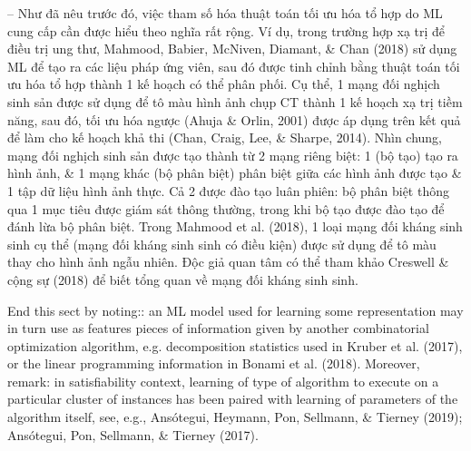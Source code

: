 \documentclass{article}
\begin{document}
\begin{itemize}
\begin{itemize}
\begin{itemize}
            -- Như đã nêu trước đó, việc tham số hóa thuật toán tối ưu hóa tổ hợp do ML cung cấp cần được hiểu theo nghĩa rất rộng. Ví dụ, trong trường hợp xạ trị để điều trị ung thư, Mahmood, Babier, McNiven, Diamant, \& Chan (2018) sử dụng ML để tạo ra các liệu pháp ứng viên, sau đó được tinh chỉnh bằng thuật toán tối ưu hóa tổ hợp thành 1 kế hoạch có thể phân phối. Cụ thể, 1 mạng đối nghịch sinh sản được sử dụng để tô màu hình ảnh chụp CT thành 1 kế hoạch xạ trị tiềm năng, sau đó, tối ưu hóa ngược (Ahuja \& Orlin, 2001) được áp dụng trên kết quả để làm cho kế hoạch khả thi (Chan, Craig, Lee, \& Sharpe, 2014). Nhìn chung, mạng đối nghịch sinh sản được tạo thành từ 2 mạng riêng biệt: 1 (bộ tạo) tạo ra hình ảnh, \& 1 mạng khác (bộ phân biệt) phân biệt giữa các hình ảnh được tạo \& 1 tập dữ liệu hình ảnh thực. Cả 2 được đào tạo luân phiên: bộ phân biệt thông qua 1 mục tiêu được giám sát thông thường, trong khi bộ tạo được đào tạo để đánh lừa bộ phân biệt. Trong Mahmood et al. (2018), 1 loại mạng đối kháng sinh sinh cụ thể (mạng đối kháng sinh sinh có điều kiện) được sử dụng để tô màu thay cho hình ảnh ngẫu nhiên. Độc giả quan tâm có thể tham khảo Creswell \& cộng sự (2018) để biết tổng quan về mạng đối kháng sinh sinh.

            End this sect by noting:: an ML model used for learning some representation may in turn use as features pieces of information given by another combinatorial optimization algorithm, e.g. decomposition statistics used in Kruber et al. (2017), or the linear programming information in Bonami et al. (2018). Moreover, remark: in satisfiability context, learning of type of algorithm to execute on a particular cluster of instances has been paired with learning of parameters of the algorithm itself, see, e.g., Ansótegui, Heymann, Pon, Sellmann, \& Tierney (2019); Ansótegui, Pon, Sellmann, \& Tierney (2017).


\end{itemize}
\end{itemize}
\end{itemize}
\end{document}
